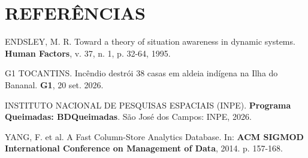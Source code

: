 \section*{REFERÊNCIAS}

{\fontsize{21}{26}\selectfont
\noindent ENDSLEY, M. R. Toward a theory of situation awareness in dynamic systems. \textbf{Human Factors}, v. 37, n. 1, p. 32-64, 1995.

\vspace{0.18cm}
\noindent G1 TOCANTINS. Incêndio destrói 38 casas em aldeia indígena na Ilha do Bananal. \textbf{G1}, 20 set. 2026.

\vspace{0.18cm}
\noindent INSTITUTO NACIONAL DE PESQUISAS ESPACIAIS (INPE). \textbf{Programa Queimadas: BDQueimadas}. São José dos Campos: INPE, 2026.

\vspace{0.18cm}
\noindent YANG, F. et al. A Fast Column-Store Analytics Database. In: \textbf{ACM SIGMOD International Conference on Management of Data}, 2014. p. 157-168.
\par}
